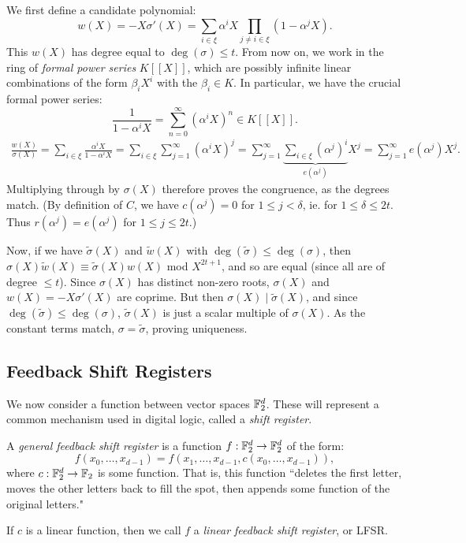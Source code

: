 \documentclass{article}
\begin{document}
\begin{prf}
    We first define a candidate polynomial:
    \[
	w(X) = -X \sigma'(X) = \sum_{i \in \xi} \alpha^i X \prod_{j \neq i \in \xi} (1-\alpha^j X).
	\]
	This $w(X)$ has degree equal to $\deg(\sigma) \leq t$. From now on, we work in the ring of \textit{formal power series} $K[[X]]$, which are possibly infinite linear combinations of the form $\beta_i X^i$ with the $\beta_i \in K$.
	In particular, we have the crucial formal power series:
	\[
	\frac{1}{1-\alpha^i X} = \sum_{n=0}^\infty (\alpha^iX)^n \in K[[X]].
	\]
	\begin{align*}
	    \frac{w(X)}{\sigma(X)} = \sum_{i \in \xi} \frac{\alpha^iX}{1-\alpha^iX}
	    = \sum_{i \in \xi} \sum_{j=1}^\infty (\alpha^iX)^j
	    = \sum_{j=1}^\infty \underbrace{\sum_{i \in \xi} (\alpha^j)^i}_{e(\alpha^j)} X^j
	    = \sum_{j=1}^\infty e(\alpha^j) X^j.
	\end{align*}
	Multiplying through by $\sigma(X)$ therefore proves the congruence, as the degrees match. (By definition of $C$, we have $c(\alpha^j) = 0$ for $1 \leq j < \delta$, ie. for $1 \leq \delta \leq 2t$. Thus $r(\alpha^j) = e(\alpha^j)$ for $1 \leq j \leq 2t$.)

	Now, if we have $\tilde \sigma(X)$ and $\tilde w(X)$ with $\deg(\tilde \sigma) \leq \deg(\sigma)$, then $\sigma(X) \tilde w(X) \equiv \tilde \sigma(X)w(X)$ mod $X^{2t+1}$, and so are equal (since all are of degree $\leq t$). Since $\sigma(X)$ has distinct non-zero roots, $\sigma(X)$ and $w(X) = -X\sigma'(X)$ are coprime. But then $\sigma(X) \mid \tilde\sigma(X)$, and since $\deg(\tilde\sigma) \leq \deg(\sigma)$, $\tilde\sigma(X)$ is just a scalar multiple of $\sigma(X)$. As the constant terms match, $\sigma = \tilde\sigma$, proving uniqueness.
\end{prf}


\subsection{Feedback Shift Registers}
\label{section-algebraic-shift-registers}

We now consider a function between vector spaces $\mathbb{F}_2^d$. These will represent a common mechanism used in digital logic, called a \textit{shift register}.

\begin{definition}
	\label{feedback-shift-register}
    A \textit{general feedback shift register} is a function $f: \mathbb{F}_2^d \to \mathbb{F}_2^d$ of the form:
    \[
	f(x_0, \dots, x_{d-1}) = f(x_1, \dots, x_{d-1}, c(x_0, \dots, x_{d-1})),
	\]
	where $c : \mathbb{F}_2^d \to \mathbb{F}_2$ is some function. That is, this function ``deletes the first letter, moves the other letters back to fill the spot, then appends some function of the original letters."
	
	If $c$ is a linear function, then we call $f$ a \textit{linear feedback shift register}, or LFSR.
\end{definition}
\end{document}
